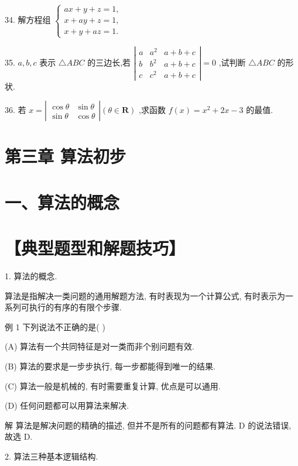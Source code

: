 \documentclass[10pt]{article}
\begin{document}
34. 解方程组 \(\left\{  \begin{array}{l} {ax} + y + z = 1, \\  x + {ay} + z = 1, \\  x + y + {az} = 1. \end{array}\right.\)

35. \(a,b,c\) 表示 \(\bigtriangleup {ABC}\) 的三边长,若 \(\left| \begin{array}{lll} a & {a}^{2} & a + b + c \\  b & {b}^{2} & a + b + c \\  c & {c}^{2} & a + b + c \end{array}\right|  = 0\) ,试判断 \(\bigtriangleup {ABC}\) 的形状.

36. 若 \(x = \left| \begin{matrix} \cos \theta & \sin \theta \\  \sin \theta & \cos \theta  \end{matrix}\right| \left( {\theta  \in  \mathbf{R}}\right)\) ,求函数 \(f\left( x\right)  = {x}^{2} + {2x} - 3\) 的最值.

\section*{第三章 算法初步}

\section*{一、算法的概念}

\section*{【典型题型和解题技巧】}

1. 算法的概念.

算法是指解决一类问题的通用解题方法, 有时表现为一个计算公式, 有时表示为一系列可执行的有序的有限个步骤.

例 1 下列说法不正确的是( )

(A) 算法有一个共同特征是对一类而非个别问题有效.

(B) 算法的要求是一步步执行, 每一步都能得到唯一的结果.

(C) 算法一般是机械的, 有时需要重复计算, 优点是可以通用.

(D) 任何问题都可以用算法来解决.

解 算法是解决问题的精确的描述, 但并不是所有的问题都有算法. D 的说法错误, 故选 D.

2. 算法三种基本逻辑结构.
\end{document}

